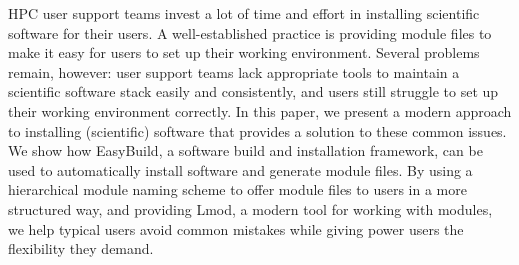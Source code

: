 HPC user support teams invest a lot of time and effort in installing
scientific software for their users. A well-established practice is
providing module files to make it easy for users to set up their
working environment.  Several problems remain, however: user support
teams lack appropriate tools to maintain a scientific software stack
easily and consistently, and users still struggle to set up their
working environment correctly.  In this paper, we present a modern
approach to installing (scientific) software that provides a solution
to these common issues. We show how EasyBuild, a software build and
installation framework, can be used to automatically install software
and generate module files.  By using a hierarchical module naming
scheme to offer module files to users in a more structured way, and
providing Lmod, a modern tool for working with modules, we help
typical users avoid common mistakes while giving power users the
flexibility they demand.

